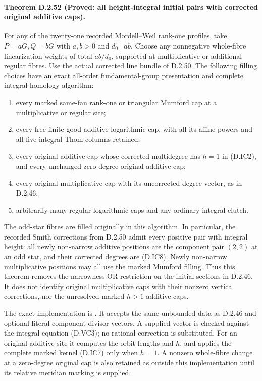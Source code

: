 \paragraph{Theorem D.2.52 (Proved: all height-integral initial pairs with corrected original additive caps).}
For any of the twenty-one recorded Mordell--Weil rank-one
profiles, take $P=aG,Q=bG$ with $a,b>0$ and
$d_0\mid ab$. Choose any nonnegative whole-fibre
linearization weights of total $ab/d_0$, supported
at multiplicative or additional regular fibres.
Use the actual corrected line bundle of D.2.50.
The following filling choices have an exact all-order
fundamental-group presentation and complete integral
homology algorithm:
\begin{enumerate}[label=(\roman*)]
\item every marked same-fan rank-one or triangular
Mumford cap at a multiplicative or regular site;
\item every free finite-good additive logarithmic cap,
with all its affine powers and all five integral Thom
columns retained;
\item every original additive cap whose corrected
multidegree has $h=1$ in (D.IC2), and every unchanged
zero-degree original additive cap;
\item every original multiplicative cap with its
uncorrected degree vector, as in D.2.46;
\item arbitrarily many regular logarithmic caps and
any ordinary integral clutch.
\end{enumerate}
The odd-star fibres are filled originally in this
algorithm. In particular, the recorded Smith
corrections from D.2.50 admit every positive pair
with integral height: all newly non-narrow additive
positions are the component pair $(2,2)$ at an odd
star, and their corrected degrees are (D.IC8).
Newly non-narrow multiplicative positions may all
use the marked Mumford filling.
Thus this theorem removes the narrowness-OR restriction
on the initial sections in D.2.46.
It does not identify original multiplicative caps
with their nonzero vertical corrections, nor the
unresolved marked $h>1$ additive caps.

The exact implementation is
.
It accepts the same unbounded data as D.2.46 and
optional literal component-divisor vectors. A supplied
vector is checked against the integral equation
(D.VC3); no rational correction is substituted.
For an original additive site it computes the
orbit lengths and $h$, and applies the complete
marked kernel (D.IC7) only when $h=1$.
A nonzero whole-fibre change at a zero-degree
original cap is also retained as outside this
implementation until its relative meridian marking
is supplied.

